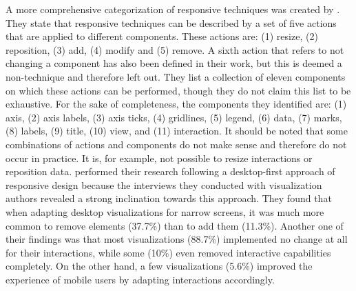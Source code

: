 A more comprehensive categorization of responsive techniques was created by \cite{TechniquesForFlexibleRespVisDesign}. They state that responsive techniques can be described by a set of five actions that are applied to different components. These actions are: (1) resize, (2) reposition, (3) add, (4) modify and (5) remove. A sixth action that refers to not changing a component has also been defined in their work, but this is deemed a non-technique and therefore left out. They list a collection of eleven components on which these actions can be performed, though they do not claim this list to be exhaustive. For the sake of completeness, the components they identified are: (1) axis, (2) axis labels, (3) axis ticks, (4) gridlines, (5) legend, (6) data, (7) marks, (8) labels, (9) title, (10) view, and (11) interaction. It should be noted that some combinations of actions and components do not make sense and therefore do not occur in practice. It is, for example, not possible to resize interactions or reposition data. \cite{TechniquesForFlexibleRespVisDesign} performed their research following a desktop-first approach of responsive design because the interviews they conducted with visualization authors revealed a strong inclination towards this approach. They found that when adapting desktop visualizations for narrow screens, it was much more common to remove elements (37.7\%) than to add them (11.3\%). Another one of their findings was that most visualizations (88.7\%) implemented no change at all for their interactions, while some (10\%) even removed interactive capabilities completely. On the other hand, a few visualizations (5.6\%) improved the experience of mobile users by adapting interactions accordingly.

